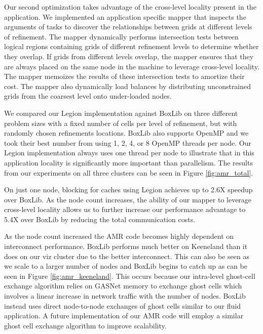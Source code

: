 Our second optimization takes advantage of the cross-level locality present in the application.  We implemented
an application specific mapper that inspects the arguments of tasks to discover the relationships between
grids at different levels of refinement.  The mapper dynamically performs intersection tests between logical regions
containing grids of different refinement levels to determine whether they overlap.  
If grids from different levels overlap, the mapper
ensures that they are always placed on the same node in the machine to leverage cross-level locality.  The mapper
memoizes the results of these intersection tests to amortize their cost.  The mapper also dynamically
load balances by distributing unconstrained grids from the coarsest level onto under-loaded nodes.

We compared our Legion implementation against BoxLib on three different problem sizes with a fixed number
of cells per level of refinement, but with randomly chosen refinements locations.  BoxLib also supports OpenMP
and we took their best number from using 1, 2, 4, or 8 OpenMP threads per node.  Our Legion implementation
always uses one thread per node to illustrate that in this application locality is significantly more important 
than parallelism.  The results from our experiments on all three clusters can be seen in Figure \ref{fig:amr_total}. 

On just one node, blocking for caches using Legion achieves up to 2.6X speedup over BoxLib.  As the node count 
increases, the ability of our mapper to leverage cross-level locality allows us to further increase
our performance advantage to 5.4X over BoxLib by reducing the total communication costs.  

As the node count increased the AMR code becomes highly dependent on interconnect performance.  BoxLib performs much better
on Keeneland than it does on our viz cluster due to the better interconnect.  This can also be seen as we scale
to a larger number of nodes and BoxLib begins to catch up as can be seen in Figure \ref{fig:amr_keeneland}.  
This occurs because our intra-level ghost-cell exchange algorithm relies on GASNet memory to exchange ghost cells which 
involves a linear increase in network traffic with the number of nodes.  BoxLib instead uses direct
node-to-node exchanges of ghost cells similar to our fluid application.  A future implementation of our AMR code 
will employ a similar ghost cell exchange algorithm to improve scalability.

